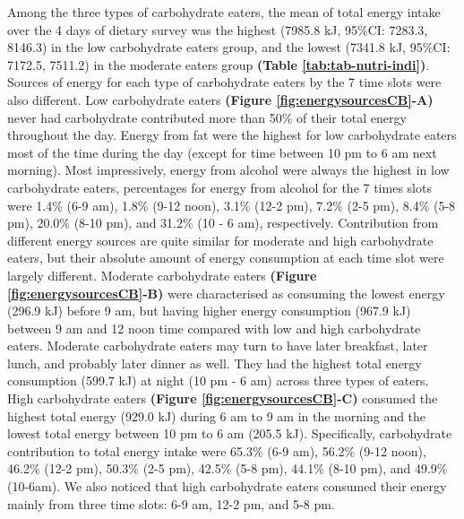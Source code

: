 Among the three types of carbohydrate eaters, the mean of total energy intake over the 4 days of dietary survey was the highest (7985.8 kJ, 95\%CI: 7283.3, 8146.3) in the low carbohydrate eaters group, and the lowest (7341.8 kJ, 95\%CI: 7172.5, 7511.2) in the moderate eaters group \textbf{(Table \ref{tab:tab-nutri-indi})}. Sources of energy for each type of carbohydrate eaters by the 7 time slots were also different. Low carbohydrate eaters \textbf{(Figure \ref{fig:energysourcesCB}-A)} never had carbohydrate contributed more than 50\% of their total energy throughout the day. Energy from fat were the highest for low carbohydrate eaters most of the time during the day (except for time between 10 pm to 6 am next morning). Most impressively, energy from alcohol were always the highest in low carbohydrate eaters, percentages for energy from alcohol for the 7 times slots were 1.4\% (6-9 am), 1.8\% (9-12 noon), 3.1\% (12-2 pm), 7.2\% (2-5 pm), 8.4\% (5-8 pm), 20.0\% (8-10 pm), and 31.2\% (10 - 6 am), respectively. Contribution from different energy sources are quite similar for moderate and high carbohydrate eaters, but their absolute amount of energy consumption at each time slot were largely different. Moderate carbohydrate eaters \textbf{(Figure \ref{fig:energysourcesCB}-B)} were characterised as consuming the lowest energy (296.9 kJ) before 9 am, but having higher energy consumption (967.9 kJ) between 9 am and 12 noon time compared with low and high carbohydrate eaters. Moderate carbohydrate eaters may turn to have later breakfast, later lunch, and probably later dinner as well. They had the highest total energy consumption (599.7 kJ) at night (10 pm - 6 am) across three types of eaters. High carbohydrate eaters \textbf{(Figure \ref{fig:energysourcesCB}-C)} consumed the highest total energy (929.0 kJ) during 6 am to 9 am in the morning and the lowest total energy between 10 pm to 6 am (205.5 kJ). Specifically, carbohydrate contribution to total energy intake were 65.3\% (6-9 am), 56.2\% (9-12 noon), 46.2\% (12-2 pm), 50.3\% (2-5 pm), 42.5\% (5-8 pm), 44.1\% (8-10 pm), and 49.9\% (10-6am). We also noticed that high carbohydrate eaters consumed their energy mainly from three time slots: 6-9 am, 12-2 pm, and 5-8 pm. 

